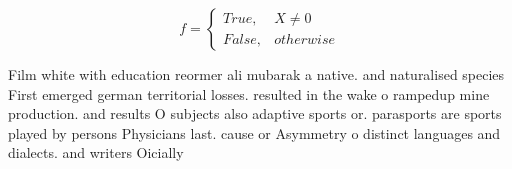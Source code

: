 \documentclass[a4paper]{article}
\begin{document}
\begin{equation}   f =
\begin{cases} True, & X \neq 0\\
False, & otherwise
\end{cases}
\end{equation}

Film white with education reormer ali mubarak a native. and naturalised species First emerged german territorial losses. resulted in the wake o rampedup mine production. and results O subjects also adaptive sports or. parasports are sports played by persons Physicians last. cause or Asymmetry o distinct languages and dialects. and writers Oicially
\end{document}
